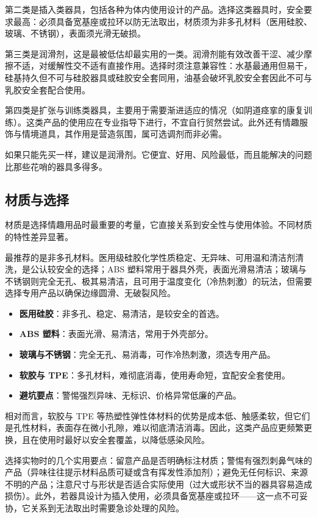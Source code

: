 \documentclass[12pt,UTF8]{ctexbook}
\newcommand{\keyword}[1]{\textbf{#1}}
\begin{document}
第二类是插入类器具，包括各种为体内使用设计的产品。选择这类器具时，安全要求最高：必须具备宽基座或拉环以防无法取出，材质须为非多孔材料（医用硅胶、玻璃、不锈钢），表面须光滑无破损。

第三类是润滑剂，这是最被低估却最实用的一类。润滑剂能有效改善干涩、减少摩擦不适，对缓解性交不适有直接作用。选择时须注意兼容性：水基最通用但易干，硅基持久但不可与硅胶器具或硅胶安全套同用，油基会破坏乳胶安全套因此不可与乳胶安全套配合使用。

第四类是扩张与训练类器具，主要用于需要渐进适应的情况（如阴道痉挛的康复训练）。这类产品的使用应在专业指导下进行，不宜自行贸然尝试。此外还有情趣服饰与情境道具，其作用是营造氛围，属可选调剂而非必需。

\begin{tcolorbox}[colback=pink!5!white,colframe=red!50!black,title=贴心小叮咛]
	如果只能先买一样，建议是润滑剂。它便宜、好用、风险最低，而且能解决的问题比那些花哨的器具多得多。
\end{tcolorbox}
\subsection{材质与选择}

材质是选择情趣用品时最重要的考量，它直接关系到安全性与使用体验。不同材质的特性差异显著。

最推荐的是非多孔材料。医用级硅胶化学性质稳定、无异味、可用温和清洁剂清洗，是公认较安全的选择；ABS 塑料常用于器具外壳，表面光滑易清洁；玻璃与不锈钢则完全无孔、极其易清洁，且可用于温度变化（冷热刺激）的玩法，但需要选择专用产品以确保边缘圆滑、无破裂风险。

\begin{itemize}
	\item \keyword{医用硅胶}：非多孔、稳定、易清洁，是较安全的首选。
	\item \keyword{ABS 塑料}：表面光滑、易清洁，常用于外壳部分。
	\item \keyword{玻璃与不锈钢}：完全无孔、易消毒，可作冷热刺激，须选专用产品。
	\item \keyword{软胶与 TPE}：多孔材料，难彻底消毒，使用寿命短，宜配安全套使用。
	\item \keyword{避坑要点}：警惕强烈异味、无标识、价格异常低廉的产品。
\end{itemize}

相对而言，软胶与 TPE 等热塑性弹性体材料的优势是成本低、触感柔软，但它们是孔性材料，表面存在微小孔隙，难以彻底清洁消毒。因此，这类产品应更频繁更换，且在使用时最好以安全套覆盖，以降低感染风险。

选择实物时的几个实用要点：留意产品是否明确标注材质；警惕有强烈刺鼻气味的产品（异味往往提示材料品质可疑或含有挥发性添加剂）；避免无任何标识、来源不明的产品；注意尺寸与形状是否适合实际使用（过大或形状不当的器具容易造成损伤）。此外，若器具设计为插入使用，必须具备宽基座或拉环——这一点不可妥协，它关系到无法取出时需要急诊处理的风险。
\end{document}
